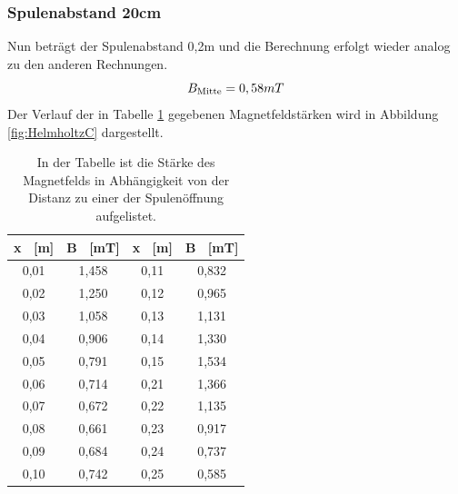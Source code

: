 \documentclass[titlepage = firstcover]{scrartcl}
\begin{document}
                \subsubsection{Spulenabstand 20cm}
                Nun beträgt der Spulenabstand 0,2m und die Berechnung erfolgt wieder analog zu den anderen Rechnungen.
                \begin{equation}
                    B_{\text{Mitte}} = 0,58 mT \\
                    \label{eqn:HelmC}
                \end{equation} 
                Der Verlauf der in Tabelle \ref{tab:HelmholtzC} gegebenen Magnetfeldstärken wird in Abbildung \ref{fig:HelmholtzC} dargestellt. 
                \begin{table}[h]
                    \centering 
                    \caption{In der Tabelle ist die Stärke des Magnetfelds in Abhängigkeit von der Distanz zu einer der Spulenöffnung aufgelistet.}
                    \label{tab:HelmholtzC}
    
                    \begin{tabular}{c c c c}
                        \toprule
                        {x \ [m]} & {B \ [mT]} & {x \ [m]} & {B \ [mT]} \\
                        \midrule
                        0,01 & 1,458 & 0,11 & 0,832 \\
                        0,02 & 1,250 & 0,12 & 0,965 \\
                        0,03 & 1,058 & 0,13 & 1,131 \\
                        0,04 & 0,906 & 0,14 & 1,330 \\
                        0,05 & 0,791 & 0,15 & 1,534 \\
                        0,06 & 0,714 & 0,21 & 1,366 \\
                        0,07 & 0,672 & 0,22 & 1,135 \\
                        0,08 & 0,661 & 0,23 & 0,917 \\
                        0,09 & 0,684 & 0,24 & 0,737 \\
                        0,10 & 0,742 & 0,25 & 0,585 \\
                        \bottomrule
                    \end{tabular}                
                \end{table}
    
\end{document}
